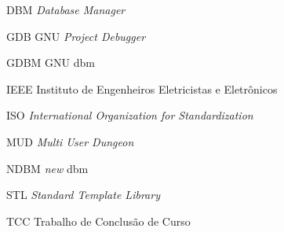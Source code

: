 \begin{siglas}
  \item[DBM] \textit{Database Manager}
  \item[GDB] GNU \textit{Project Debugger}
  \item[GDBM] GNU dbm
  \item[IEEE] Instituto de Engenheiros Eletricistas e Eletrônicos
  \item[ISO] \textit{International Organization for Standardization}
  \item[MUD] \textit{Multi User Dungeon}
  \item[NDBM] \textit{new} dbm 
  \item[STL] \textit{Standard Template Library}
  \item[TCC] Trabalho de Conclusão de Curso 
\end{siglas}
